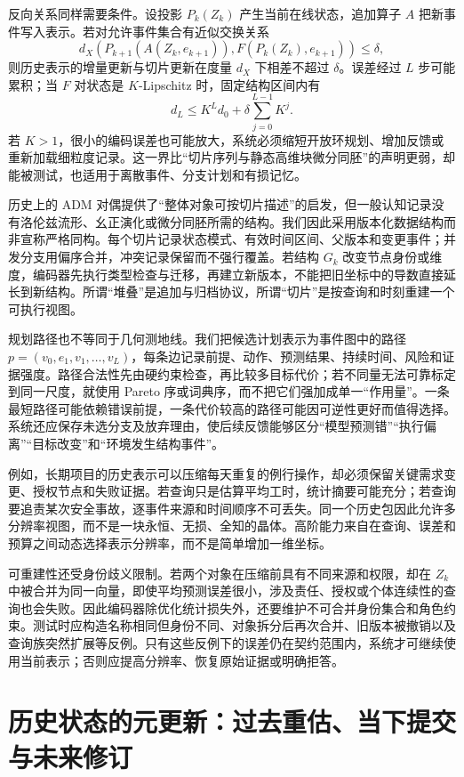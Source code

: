 反向关系同样需要条件。设投影 $P_k(Z_k)$ 产生当前在线状态，追加算子 $A$ 把新事件写入表示。若对允许事件集合有近似交换关系
\[
d_X\!\left(P_{k+1}(A(Z_k,e_{k+1})),F(P_k(Z_k),e_{k+1})\right)\leq\delta,
\]
则历史表示的增量更新与切片更新在度量 $d_X$ 下相差不超过 $\delta$。误差经过 $L$ 步可能累积；当 $F$ 对状态是 $K$-Lipschitz 时，固定结构区间内有
\[
d_L\leq K^Ld_0+\delta\sum_{j=0}^{L-1}K^j.
\]
若 $K>1$，很小的编码误差也可能放大，系统必须缩短开放环规划、增加反馈或重新加载细粒度记录。这一界比“切片序列与静态高维块微分同胚”的声明更弱，却能被测试，也适用于离散事件、分支计划和有损记忆。

历史上的 ADM 对偶提供了“整体对象可按切片描述”的启发，但一般认知记录没有洛伦兹流形、幺正演化或微分同胚所需的结构。我们因此采用版本化数据结构而非宣称严格同构。每个切片记录状态模式、有效时间区间、父版本和变更事件；并发分支用偏序合并，冲突记录保留而不强行覆盖。若结构 $G_k$ 改变节点身份或维度，编码器先执行类型检查与迁移，再建立新版本，不能把旧坐标中的导数直接延长到新结构。所谓“堆叠”是追加与归档协议，所谓“切片”是按查询和时刻重建一个可执行视图。

规划路径也不等同于几何测地线。我们把候选计划表示为事件图中的路径 $p=(v_0,e_1,v_1,\ldots,v_L)$，每条边记录前提、动作、预测结果、持续时间、风险和证据强度。路径合法性先由硬约束检查，再比较多目标代价；若不同量无法可靠标定到同一尺度，就使用 Pareto 序或词典序，而不把它们强加成单一“作用量”。一条最短路径可能依赖错误前提，一条代价较高的路径可能因可逆性更好而值得选择。系统还应保存未选分支及放弃理由，使后续反馈能够区分“模型预测错”“执行偏离”“目标改变”和“环境发生结构事件”。

例如，长期项目的历史表示可以压缩每天重复的例行操作，却必须保留关键需求变更、授权节点和失败证据。若查询只是估算平均工时，统计摘要可能充分；若查询要追责某次安全事故，逐事件来源和时间顺序不可丢失。同一个历史包因此允许多分辨率视图，而不是一块永恒、无损、全知的晶体。高阶能力来自在查询、误差和预算之间动态选择表示分辨率，而不是简单增加一维坐标。

可重建性还受身份歧义限制。若两个对象在压缩前具有不同来源和权限，却在 $Z_k$ 中被合并为同一向量，即使平均预测误差很小，涉及责任、授权或个体连续性的查询也会失败。因此编码器除优化统计损失外，还要维护不可合并身份集合和角色约束。测试时应构造名称相同但身份不同、对象拆分后再次合并、旧版本被撤销以及查询族突然扩展等反例。只有这些反例下的误差仍在契约范围内，系统才可继续使用当前表示；否则应提高分辨率、恢复原始证据或明确拒答。

\section{历史状态的元更新：过去重估、当下提交与未来修订}

